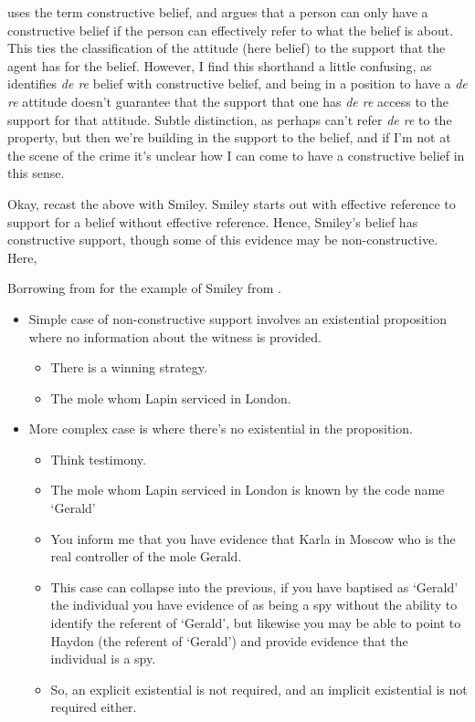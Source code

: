 \documentclass[10pt]{article}
\begin{document}
\begin{note}
  \citeauthor{Over:1983aa} uses the term constructive belief, and argues that a person can only have a constructive belief if the person can effectively refer to what the belief is about.
  This ties the classification of the attitude (here belief) to the support that the agent has for the belief.
  However, I find this shorthand a little confusing, as \citeauthor{Over:1983aa} identifies \emph{de re} belief with constructive belief, and being in a position to have a \emph{de re} attitude doesn't guarantee that the support that one has \emph{de re} access to the support for that attitude.
  Subtle distinction, as perhaps can't refer \emph{de re} to the property, but then we're building in the support to the belief, and if I'm not at the scene of the crime it's unclear how I can come to have a constructive belief in this sense.
\end{note}

\begin{note}
  Okay, recast the above with Smiley.
  Smiley starts out with effective reference to support for a belief without effective reference.
  Hence, Smiley's belief has constructive support, though some of this evidence may be non-constructive.
  Here, 
\end{note}

Borrowing from \cite{Over:1987aa} for the example of Smiley from \textcite{Carre:1974aa}.

\begin{itemize}
\item Simple case of non-constructive support involves an existential proposition where no information about the witness is provided.
  \begin{itemize}
  \item There is a winning strategy.
  \item The mole whom Lapin serviced in London.
  \end{itemize}
\item More complex case is where there's no existential in the proposition.
  \begin{itemize}
  \item Think testimony.
  \item The mole whom Lapin serviced in London is known by the code name `Gerald'
  \item You inform me that you have evidence that Karla in Moscow who is the real controller of the mole Gerald.
  \item This case can collapse into the previous, if you have baptised as `Gerald' the individual you have evidence of as being a spy without the ability to identify the referent of `Gerald', but likewise you may be able to point to Haydon (the referent of `Gerald') and provide evidence that the individual is a spy.
  \item So, an explicit existential is not required, and an implicit existential is not required either.
  \end{itemize}
\end{itemize}
\end{document}
